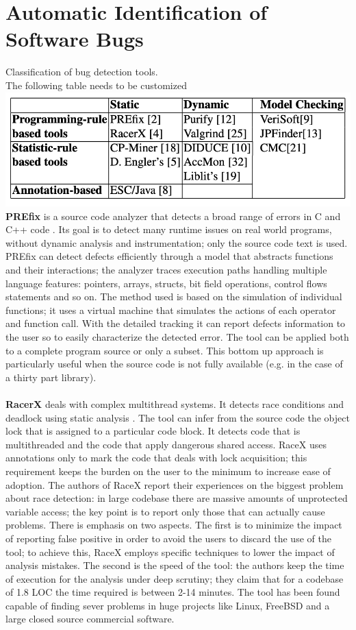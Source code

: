 
\section{Automatic Identification of Software Bugs}
Classification of bug detection tools.\\
The following table needs to be customized\\
\includegraphics{classification-of-bug-detection-tools.png}
\\
\textbf{PREfix} is a source code analyzer that detects a broad range of errors in C and C++ code \cite{bush2000static}.
Its goal is to detect many runtime issues on real world programs, without dynamic analysis and instrumentation; only the source code text is used. PREfix can detect defects efficiently through a model that abstracts functions and their interactions; the analyzer traces execution paths handling multiple language features: pointers, arrays, structs, bit field operations, control flows statements and so on.
The method used is based on the simulation of individual functions; it uses a virtual machine that simulates the actions of each operator and function call. With the detailed tracking it can report defects information to the user so to easily characterize the detected error.
The tool can be applied both to a complete program source or only a subset. This bottom up approach is particularly useful when the source code is not fully available (e.g. in the case of a thirty part library).
\\
\\
\textbf{RacerX} deals with complex multithread systems. It detects race conditions and deadlock using static analysis \cite{engler2003racerx}.
The tool can infer from the source code the object lock that is assigned to a particular code block. It detects code that is multithreaded and the code that apply dangerous shared access. 
RaceX uses annotations only to mark the code that deals with lock acquisition; this requirement keeps the burden on the user to the minimum to increase ease of adoption. The authors of RaceX report their experiences on the biggest problem about race detection: in large codebase there are massive amounts of unprotected variable access; the key point is to report only those that can actually cause problems. There is emphasis on two aspects. The first is to minimize the impact of reporting false positive in order to avoid the users to discard the use of the tool; to achieve this, RaceX employs specific techniques to lower the impact of analysis mistakes. The second is the speed of the tool: the authors keep the time of execution for the analysis under deep scrutiny; they claim that for a codebase of 1.8 LOC the time required is between 2-14 minutes. The tool has been found capable of finding sever problems in huge projects like Linux, FreeBSD and a large closed source commercial software.
